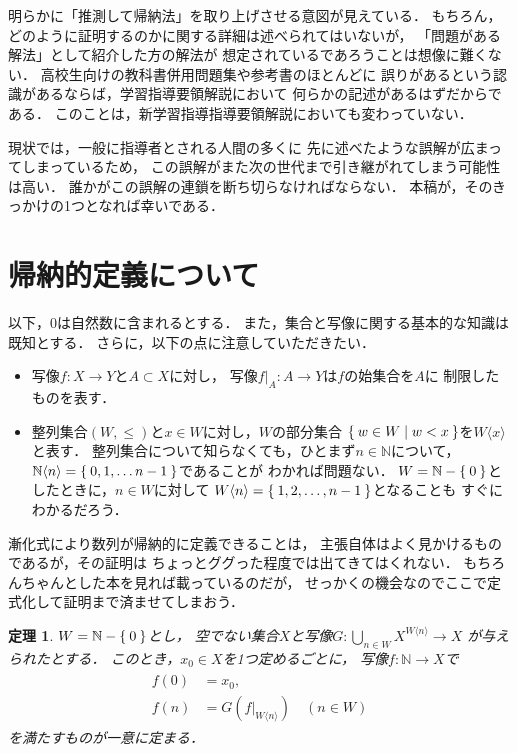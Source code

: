\documentclass[11pt,a4paper]{ltjsarticle} %
\theoremstyle{mystyle} %
\newtheorem{thm}{定理} %
\begin{document}
明らかに「推測して帰納法」を取り上げさせる意図が見えている．
もちろん，どのように証明するのかに関する詳細は述べられてはいないが，
「問題がある解法」として紹介した方の解法が
想定されているであろうことは想像に難くない．
高校生向けの教科書併用問題集や参考書のほとんどに
誤りがあるという認識があるならば，学習指導要領解説において
何らかの記述があるはずだからである．
このことは，新学習指導指導要領解説においても変わっていない．


現状では，一般に指導者とされる人間の多くに
先に述べたような誤解が広まってしまっているため，
この誤解がまた次の世代まで引き継がれてしまう可能性は高い．
誰かがこの誤解の連鎖を断ち切らなければならない．
本稿が，そのきっかけの1つとなれば幸いである．




\section{帰納的定義について}


以下，$0$は自然数に含まれるとする．
また，集合と写像に関する基本的な知識は既知とする．
さらに，以下の点に注意していただきたい．
\begin{itemize}
	\item 写像$f \colon X \longrightarrow Y$と$A \subset X$に対し，
	      写像$f|_A \colon A \longrightarrow Y$は$f$の始集合を$A$に
	      制限したものを表す．
	\item 整列集合$(W, \leq)$と$x \in W$に対し，$W$の部分集合
	      $\Set{ w \in W \mid w < x}$を$W \langle x \rangle$と表す．
	      整列集合について知らなくても，ひとまず$n \in \mathbb{N}$について，
	      $\mathbb{N} \langle n \rangle = \Set{ 0,1, \ldots n-1}$であることが
	      わかれば問題ない．
	      $W = \mathbb{N} - \Set{0}$としたときに，$n \in W$に対して
	      $W \langle n \rangle = \Set{1,2, \ldots, n-1}$となることも
	      すぐにわかるだろう．
\end{itemize}


漸化式により数列が帰納的に定義できることは，
主張自体はよく見かけるものであるが，その証明は
ちょっとググった程度では出てきてはくれない．
もちろんちゃんとした本を見れば載っているのだが，
せっかくの機会なのでここで定式化して証明まで済ませてしまおう．

\begin{thm} \label{thm:inddef}
	$W= \mathbb{N} - \Set{0}$とし，
	空でない集合$X$と写像$G \colon \bigcup_{n \in W }
		X^{W \langle n \rangle} \longrightarrow X$
	が与えられたとする．
	このとき，$x_0 \in X$を1つ定めるごとに，
	写像$f \colon \mathbb{N} \longrightarrow X$で
	\begin{align}
		\begin{aligned}
			f(0) & = x_0 ,                                     \\
			f(n) & = G \left( f|_{W \langle n \rangle} \right)
			\quad ( n \in W )
		\end{aligned}
		\label{eq:inddef}
	\end{align}
	を満たすものが一意に定まる．
\end{thm}
\end{document}
